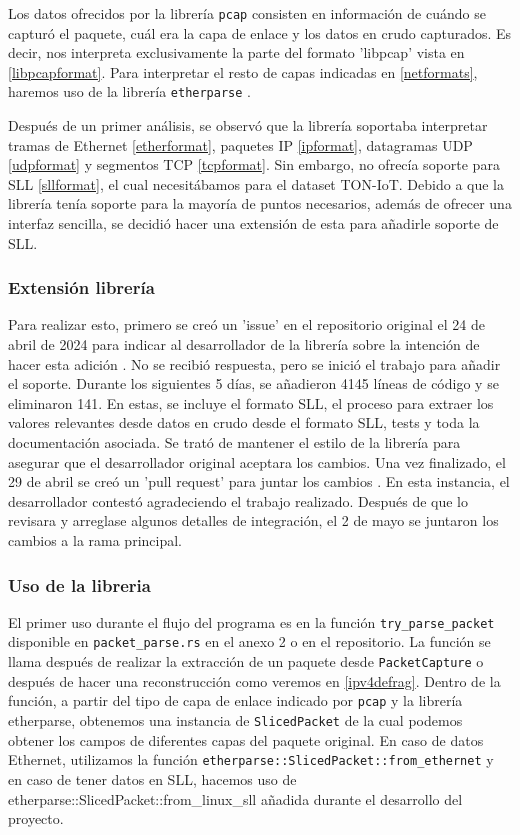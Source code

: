 Los datos ofrecidos por la librería \texttt{pcap} consisten en información de cuándo se capturó el paquete, cuál era la capa de enlace y los datos en crudo capturados. Es decir, nos interpreta exclusivamente la parte del formato 'libpcap' vista en \ref{libpcapformat}. Para interpretar el resto de capas indicadas en \ref{netformats}, haremos uso de la librería \texttt{etherparse} \cite{etherparse}.

Después de un primer análisis, se observó que la librería soportaba interpretar tramas de Ethernet \ref{etherformat}, paquetes IP \ref{ipformat}, datagramas UDP \ref{udpformat} y segmentos TCP \ref{tcpformat}. Sin embargo, no ofrecía soporte para SLL \ref{sllformat}, el cual necesitábamos para el dataset TON-IoT. Debido a que la librería tenía soporte para la mayoría de puntos necesarios, además de ofrecer una interfaz sencilla, se decidió hacer una extensión de esta para añadirle soporte de SLL. 

\subsubsection{Extensión librería}

Para realizar esto, primero se creó un 'issue' en el repositorio original el 24 de abril de 2024 para indicar al desarrollador de la librería sobre la intención de hacer esta adición \cite{slladdsllissue}. No se recibió respuesta, pero se inició el trabajo para añadir el soporte. Durante los siguientes 5 días, se añadieron 4145 líneas de código y se eliminaron 141. En estas, se incluye el formato SLL, el proceso para extraer los valores relevantes desde datos en crudo desde el formato SLL, tests y toda la documentación asociada. Se trató de mantener el estilo de la librería para asegurar que el desarrollador original aceptara los cambios. Una vez finalizado, el 29 de abril se creó un 'pull request' para juntar los cambios \cite{slladdsllpr}. En esta instancia, el desarrollador contestó agradeciendo el trabajo realizado. Después de que lo revisara y arreglase algunos detalles de integración, el 2 de mayo se juntaron los cambios a la rama principal.

\subsubsection{Uso de la libreria}

El primer uso durante el flujo del programa es en la función \texttt{try\_parse\_packet} disponible en \texttt{packet\_parse.rs} en el anexo 2 o en el repositorio. La función se llama después de realizar la extracción de un paquete desde \texttt{PacketCapture} o después de hacer una reconstrucción como veremos en \ref{ipv4defrag}. Dentro de la función, a partir del tipo de capa de enlace indicado por \texttt{pcap} y la librería etherparse, obtenemos una instancia de \texttt{SlicedPacket} de la cual podemos obtener los campos de diferentes capas del paquete original. En caso de datos Ethernet, utilizamos la función \texttt{etherparse::SlicedPacket::from\_ethernet} y en caso de tener datos en SLL, hacemos uso de {etherparse::SlicedPacket::from\_linux\_sll} añadida durante el desarrollo del proyecto.

